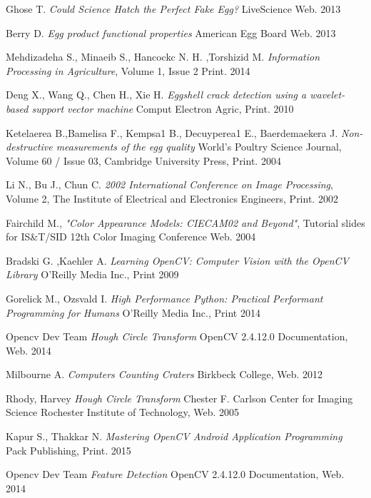 \documentclass[12pt,twoside,a4paper]{article}
\begin{document}
\begin{thebibliography}{1}


Ghose T.
\textit{Could Science Hatch the Perfect Fake Egg?}  LiveScience Web. 2013
 
Berry D.
\textit{Egg product functional properties} 
American Egg Board Web. 2013

Mehdizadeha S., Minaeib S., Hancockc N. H. ,Torshizid M.
\textit{Information Processing in Agriculture}, Volume 1, Issue 2 
Print. 2014

Deng X., Wang Q., Chen H., Xie H.
\textit{Eggshell crack detection using a wavelet-based support vector machine} Comput Electron Agric, Print. 2010

Ketelaerea B.,Bamelisa F., Kempsa1 B., Decuyperea1 E., Baerdemaekera J.
\textit{Non-destructive measurements of the egg quality} World's Poultry Science Journal, Volume 60 / Issue 03,  Cambridge University Press, Print. 2004
 

Li N., Bu J., Chun C. 
\textit{2002 International Conference on Image Processing}, Volume 2, The Institute of Electrical and Electronics Engineers, Print. 2002

Fairchild M., 
\textit{"Color Appearance Models: CIECAM02 and Beyond"}, Tutorial slides for IS\&T/SID 12th Color Imaging Conference Web. 2004
 
Bradski G. ,Kaehler A.
\textit{Learning OpenCV: Computer Vision with the OpenCV Library} O'Reilly Media Inc., Print 2009


Gorelick M., Ozsvald I.
\textit{High Performance Python: Practical Performant Programming for Humans} O'Reilly Media Inc., Print 2014

Opencv Dev Team
\textit{Hough Circle Transform} OpenCV 2.4.12.0 Documentation, Web. 2014

Milbourne A.
\textit{Computers Counting Craters} Birkbeck College, Web. 2012

Rhody, Harvey
\textit{Hough Circle Transform} Chester F. Carlson Center for Imaging Science Rochester Institute of Technology, Web. 2005

Kapur S., Thakkar N.
\textit{Mastering OpenCV Android Application Programming} Pack Publishing, Print. 2015

Opencv Dev Team
\textit{Feature Detection} OpenCV 2.4.12.0 Documentation, Web. 2014


\end{thebibliography}
\end{document}
